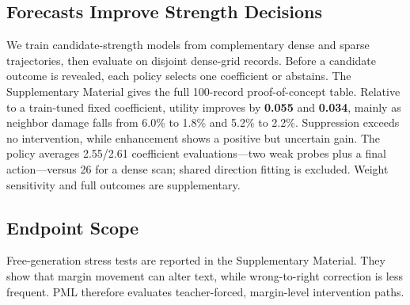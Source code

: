 \subsection{Forecasts Improve Strength Decisions}

We train candidate-strength models from complementary dense and sparse
trajectories, then evaluate on disjoint dense-grid records. Before a candidate
outcome is revealed, each policy selects one coefficient or abstains. The
Supplementary Material gives the full 100-record proof-of-concept table.
Relative to a train-tuned fixed coefficient, utility improves by \textbf{0.055}
and \textbf{0.034}, mainly as neighbor damage falls from 6.0\% to 1.8\% and
5.2\% to 2.2\%. Suppression exceeds no intervention, while enhancement shows
a positive but uncertain gain. The policy averages 2.55/2.61 coefficient evaluations---two
weak probes plus a final action---versus 26 for a dense scan; shared direction
fitting is excluded. Weight sensitivity and full outcomes are supplementary.

\subsection{Endpoint Scope}

Free-generation stress tests are reported in the Supplementary Material. They
show that margin movement can alter text, while wrong-to-right correction is
less frequent. PML therefore evaluates teacher-forced,
margin-level intervention paths.
